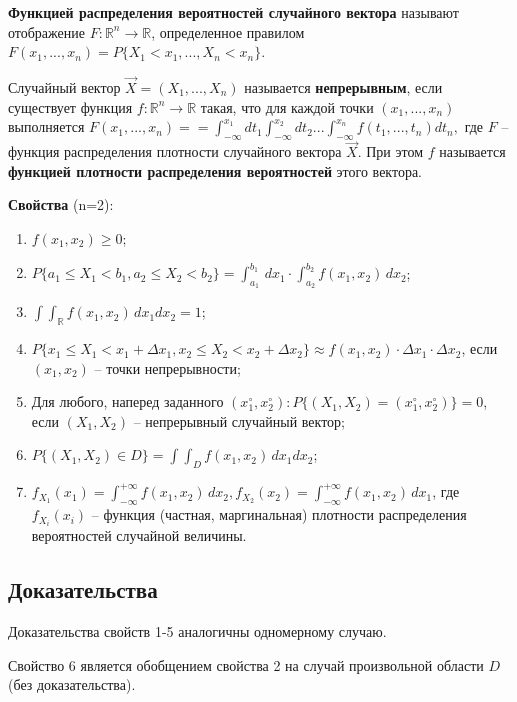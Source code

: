 \textbf{Функцией распределения вероятностей случайного вектора} называют отображение $F: \mathbb{R}^n \rightarrow \mathbb{R}$, определенное правилом $F(x_1, ..., x_n) = P\{X_1 < x_1,..., X_n < x_n\}$.

Случайный вектор $\vec{X} = (X_1,...,X_n)$ называется \textbf{непрерывным}, если существует функция $f: \mathbb{R}^n \rightarrow \mathbb{R}$ такая, что для каждой точки $(x_1,...,x_n)$ выполняется $F(x_1,...,x_n) =$\newline$= \int_{-\infty}^{x_1}dt_1 \int_{-\infty}^{x_2}dt_2 ... \int_{-\infty}^{x_n}f(t_1,...,t_n)dt_n,$ где $F$ -- функция распределения плотности случайного вектора $\vec{X}$. При этом $f$ называется \textbf{функцией плотности распределения вероятностей} этого вектора.

\textbf{Свойства} (n=2):
\begin{enumerate}
	\item $f(x_1, x_2) \geq 0$;
	\item $P\{a_1 \leq X_1 < b_1, a_2 \leq X_2 < b_2\} = \int_{a_1}^{b_1} \, dx_1 \cdot \int_{a_2}^{b_2} f(x_1, x_2)\, dx_2$;
	\item $\int \int_{\mathbb{R}} f(x_1, x_2)\, dx_1dx_2 = 1$;
	\item $P\{x_1 \leq X_1 < x_1 + \Delta x_1, x_2 \leq X_2 < x_2 + \Delta x_2\} \approx f(x_1, x_2) \cdot \Delta x_1 \cdot \Delta x_2$, если $(x_1, x_2)$ -- точки непрерывности;
	\item Для любого, наперед заданного $(x_1^\circ, x_2^\circ): P\{(X_1, X_2) = (x_1^\circ, x_2^\circ)\} = 0$, если $(X_1, X_2)$ -- непрерывный случайный вектор;
	\item $P\{(X_1, X_2) \in D\} = \int \int_D f(x_1, x_2) \, dx_1dx_2$;
	\item $f_{X_1} (x_1) = \int_{- \infty}^{+\infty} f(x_1, x_2) \, dx_2, f_{X_2} (x_2) = \int_{- \infty}^{+\infty} f(x_1, x_2) \, dx_1$, где $f_{X_i}(x_i)$ -- функция (частная, маргинальная) плотности распределения вероятностей случайной величины.
\end{enumerate}

\subsection*{Доказательства}

Доказательства свойств 1-5 аналогичны одномерному случаю.

Свойство 6 является обобщением свойства 2 на случай произвольной области $D$ (без доказательства).

